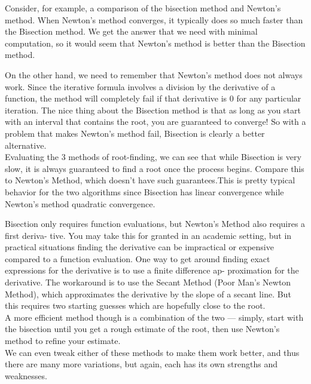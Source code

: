 \documentclass[11pt]{article}
\begin{document}
Consider, for example, a comparison of the bisection method and Newton’s method. When Newton’s method converges, it typically does so much faster than the Bisection method. We get the answer that we need with minimal computation, so it would seem that Newton’s method is better than the Bisection method. 

On the other hand, we need to remember that Newton’s method does not always work. Since the iterative formula involves a division by the derivative of a function, the method will completely fail if that derivative is 0 for any particular iteration. The nice thing about the Bisection method is that as long as you start with an interval that contains the root, you are guaranteed to converge! So with a problem that makes Newton’s method fail, Bisection is clearly a better alternative.\\

Evaluating the 3 methods of root-finding, we can see that while Bisection is very slow, it is always guaranteed to find a root once the process begins.
Compare this to Newton’s Method, which doesn’t have such guarantees.This is pretty typical behavior for the two algorithms since Bisection has linear convergence while Newton’s method quadratic convergence.

Bisection only requires function evaluations, but Newton’s Method also requires a first deriva-
tive. You may take this for granted in an academic setting, but in practical situations finding
the derivative can be impractical or expensive compared to a function evaluation. One way
to get around finding exact expressions for the derivative is to use a finite difference ap-
proximation for the derivative. The workaround is to use the Secant Method (Poor Man’s Newton Method), which approximates the derivative by the slope of a secant line. But this requires two starting guesses which are hopefully close to the root.\\

A more efficient method though is a combination of the two — simply, start with the bisection until you get a rough estimate of the root, then use Newton’s method to refine your estimate.\\


We can even tweak either of these methods to make them work better, and thus there are many more variations, but again, each has its own strengths and weaknesses.\\
\end{document}
